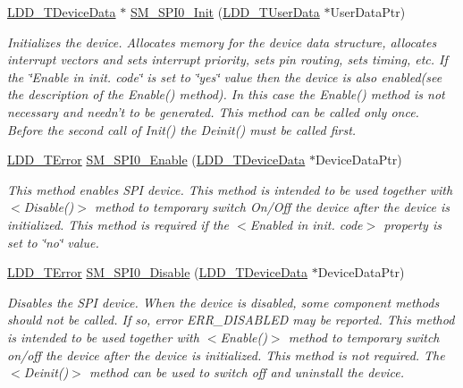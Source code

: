 \begin{DoxyCompactItemize}
\item 
\hyperlink{group___p_e___types__module_gac5cf1362f1f0e3a2ce71b1bf2276d091}{L\-D\-D\-\_\-\-T\-Device\-Data} $\ast$ \hyperlink{group___s_m___s_p_i0__module_ga9695223438dc87b3bd2e720cadf1a40e}{S\-M\-\_\-\-S\-P\-I0\-\_\-\-Init} (\hyperlink{group___p_e___types__module_ga0b66a73f87238a782318aa0be7578e35}{L\-D\-D\-\_\-\-T\-User\-Data} $\ast$User\-Data\-Ptr)
\begin{DoxyCompactList}\small\item\em Initializes the device. Allocates memory for the device data structure, allocates interrupt vectors and sets interrupt priority, sets pin routing, sets timing, etc. If the \char`\"{}\-Enable in init. code\char`\"{} is set to \char`\"{}yes\char`\"{} value then the device is also enabled(see the description of the Enable() method). In this case the Enable() method is not necessary and needn't to be generated. This method can be called only once. Before the second call of Init() the Deinit() must be called first. \end{DoxyCompactList}\item 
\hyperlink{group___p_e___types__module_ga24c2b045fd04e79e85f261ce4df35588}{L\-D\-D\-\_\-\-T\-Error} \hyperlink{group___s_m___s_p_i0__module_ga7a0101661c362b85b8ff6d399ccce8e1}{S\-M\-\_\-\-S\-P\-I0\-\_\-\-Enable} (\hyperlink{group___p_e___types__module_gac5cf1362f1f0e3a2ce71b1bf2276d091}{L\-D\-D\-\_\-\-T\-Device\-Data} $\ast$Device\-Data\-Ptr)
\begin{DoxyCompactList}\small\item\em This method enables S\-P\-I device. This method is intended to be used together with $<$Disable()$>$ method to temporary switch On/\-Off the device after the device is initialized. This method is required if the $<$Enabled in init. code$>$ property is set to \char`\"{}no\char`\"{} value. \end{DoxyCompactList}\item 
\hyperlink{group___p_e___types__module_ga24c2b045fd04e79e85f261ce4df35588}{L\-D\-D\-\_\-\-T\-Error} \hyperlink{group___s_m___s_p_i0__module_ga38cb2d4bd7ed0210fbd9d98a684de4a4}{S\-M\-\_\-\-S\-P\-I0\-\_\-\-Disable} (\hyperlink{group___p_e___types__module_gac5cf1362f1f0e3a2ce71b1bf2276d091}{L\-D\-D\-\_\-\-T\-Device\-Data} $\ast$Device\-Data\-Ptr)
\begin{DoxyCompactList}\small\item\em Disables the S\-P\-I device. When the device is disabled, some component methods should not be called. If so, error E\-R\-R\-\_\-\-D\-I\-S\-A\-B\-L\-E\-D may be reported. This method is intended to be used together with $<$Enable()$>$ method to temporary switch on/off the device after the device is initialized. This method is not required. The $<$Deinit()$>$ method can be used to switch off and uninstall the device. \end{DoxyCompactList}\item 

\end{DoxyCompactItemize}
